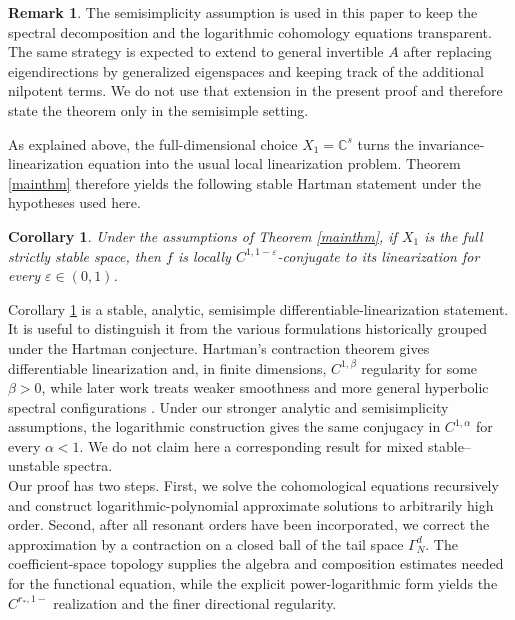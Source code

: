\documentclass{amsart}
\theoremstyle{plain}
\newtheorem{corollary}[theorem]{Corollary}
\theoremstyle{definition}
\newtheorem{remark}[theorem]{Remark}
\begin{document}
\begin{remark}
The semisimplicity assumption is used in this paper to keep the spectral decomposition and the logarithmic cohomology equations transparent. The same strategy is expected to extend to general invertible $A$ after replacing eigendirections by generalized eigenspaces and keeping track of the additional nilpotent terms. We do not use that extension in the present proof and therefore state the theorem only in the semisimple setting.
\end{remark}


As explained above, the full-dimensional choice $X_1=\mathbb{C}^s$ turns the invariance-linearization equation into the usual local linearization problem. Theorem \ref{mainthm} therefore yields the following stable Hartman statement under the hypotheses used here.


\begin{corollary}\label{cor_Hartman}
    Under the assumptions of Theorem \ref{mainthm}, if $X_1$ is the full strictly stable space, then $f$ is locally $C^{1,1-\varepsilon}$-conjugate to its linearization for every $\varepsilon\in(0,1)$.
\end{corollary}

Corollary \ref{cor_Hartman} is a stable, analytic, semisimple differentiable-linearization statement. It is useful to distinguish it from the various formulations historically grouped under the Hartman conjecture. Hartman's contraction theorem gives differentiable linearization and, in finite dimensions, $C^{1,\beta}$ regularity for some $\beta>0$, while later work treats weaker smoothness and more general hyperbolic spectral configurations \cite{hartman1960local,newhouse2017hartman,zhang2017differentiability}. Under our stronger analytic and semisimplicity assumptions, the logarithmic construction gives the same conjugacy in $C^{1,\alpha}$ for every $\alpha<1$. We do not claim here a corresponding result for mixed stable--unstable spectra.\\

Our proof has two steps. First, we solve the cohomological equations recursively and construct logarithmic-polynomial approximate solutions to arbitrarily high order. Second, after all resonant orders have been incorporated, we correct the approximation by a contraction on a closed ball of the tail space $\Gamma_N^d$. The coefficient-space topology supplies the algebra and composition estimates needed for the functional equation, while the explicit power-logarithmic form yields the $C^{r_*,1-}$ realization and the finer directional regularity.\\
\end{document}

